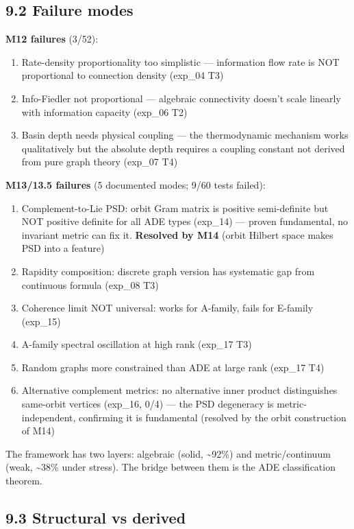 \documentclass[11pt,a4paper]{article}
\providecommand{\tightlist}{\setlength{\itemsep}{0pt}\setlength{\parskip}{0pt}}
\begin{document}
\subsection*{9.2 Failure modes}

\textbf{M12 failures} (3/52):
\begin{enumerate}\tightlist
\item Rate-density proportionality too simplistic — information flow rate is NOT proportional to connection density (exp\_04 T3)
\item Info-Fiedler not proportional — algebraic connectivity doesn't scale linearly with information capacity (exp\_06 T2)
\item Basin depth needs physical coupling — the thermodynamic mechanism works qualitatively but the absolute depth requires a coupling constant not derived from pure graph theory (exp\_07 T4)
\end{enumerate}

\textbf{M13/13.5 failures} (5 documented modes; 9/60 tests failed):
\begin{enumerate}\tightlist
\item Complement-to-Lie PSD: orbit Gram matrix is positive semi-definite but NOT positive definite for all ADE types (exp\_14) — proven fundamental, no invariant metric can fix it. \textbf{Resolved by M14} (orbit Hilbert space makes PSD into a feature)
\item Rapidity composition: discrete graph version has systematic gap from continuous formula (exp\_08 T3)
\item Coherence limit NOT universal: works for A-family, fails for E-family (exp\_15)
\item A-family spectral oscillation at high rank (exp\_17 T3)
\item Random graphs more constrained than ADE at large rank (exp\_17 T4)
\item Alternative complement metrics: no alternative inner product distinguishes same-orbit vertices (exp\_16, 0/4) — the PSD degeneracy is metric-independent, confirming it is fundamental (resolved by the orbit construction of M14)
\end{enumerate}

The framework has two layers: algebraic (solid, \textasciitilde{}92\%) and metric/continuum (weak, \textasciitilde{}38\% under stress). The bridge between them is the ADE classification theorem.

\subsection*{9.3 Structural vs derived}
\end{document}
